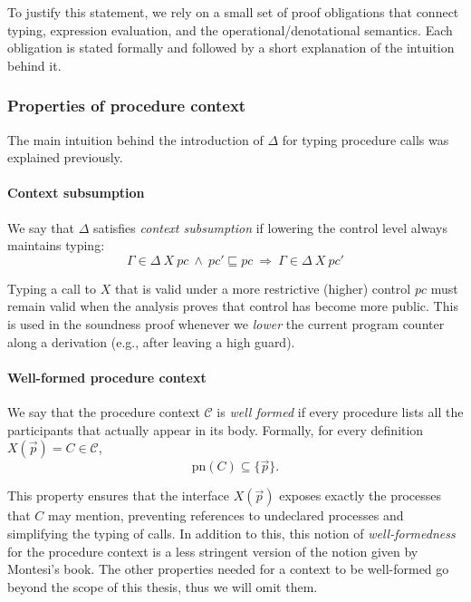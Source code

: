 \documentclass[12pt,a4paper,twoside]{book}
\newcommand{\pn}{\mathrm{pn}}
\begin{document}
\medskip

\noindent
To justify this statement, we rely on a small set of proof obligations that connect typing, expression evaluation, and the operational/denotational semantics. Each obligation is stated formally and followed by a short explanation of the intuition behind it.

\subsubsection{Properties of procedure context}
The main intuition behind the introduction of $\Delta$ for typing procedure calls was explained previously.

\paragraph{Context subsumption}
We say that \(\Delta\) satisfies \emph{context subsumption} if lowering the control level always maintains typing:
\begin{equation}\label{ass:ctx_sub}
  \Gamma \in \Delta~X~pc\ \wedge\ pc' \sqsubseteq pc
  \ \Longrightarrow\
  \Gamma \in \Delta~X~pc'
\end{equation}

Typing a call to \(X\) that is valid under a more restrictive (higher) control
  \(pc\) must remain valid when the analysis proves that control has become more public.
  This is used in the soundness proof whenever we \emph{lower} the current program counter along a derivation (e.g., after leaving a high guard).

\paragraph{Well-formed procedure context}
We say that the procedure context \(\mathscr{C}\) is \emph{well formed} if every procedure lists all the participants that actually appear in its body. Formally, for every definition \(X(\vec{p}) = C \in \mathscr{C}\),
\begin{equation} \label{ass:wellf_ctx}
  \pn(C) \subseteq \{\vec{p}\}.
\end{equation}

This property ensures that the interface \(X(\vec{p})\) exposes exactly the processes that \(C\) may mention, preventing references to undeclared processes and simplifying the typing of calls. In addition to this, this notion of \emph{well-formedness} for the procedure context is a less stringent version of the notion given by Montesi's book\cite{montesi2023introduction}.
The other properties needed for a context to be well-formed go beyond the scope of this thesis, thus we will omit them.
\end{document}
